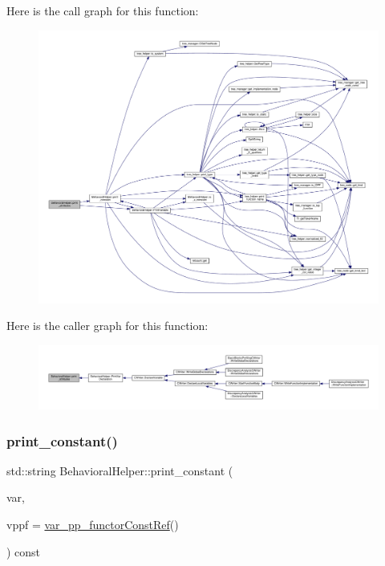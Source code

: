 Here is the call graph for this function\+:
\nopagebreak
\begin{figure}[H]
\begin{center}
\leavevmode
\includegraphics[width=350pt]{dd/db2/classBehavioralHelper_ad96b5f4d33d92f732ad3a30a70b42643_cgraph}
\end{center}
\end{figure}
Here is the caller graph for this function\+:
\nopagebreak
\begin{figure}[H]
\begin{center}
\leavevmode
\includegraphics[width=350pt]{dd/db2/classBehavioralHelper_ad96b5f4d33d92f732ad3a30a70b42643_icgraph}
\end{center}
\end{figure}
\mbox{\label{classBehavioralHelper_a5dcc301cc61cb672f0a2b593ceb61a2f}} 
\subsubsection{\texorpdfstring{print\+\_\+constant()}{print\_constant()}}
{\footnotesize\ttfamily std\+::string Behavioral\+Helper\+::print\+\_\+constant (\begin{DoxyParamCaption}\item[{unsigned int}]{var,  }\item[{const \hyperlink{var__pp__functor_8hpp_a8a6b51b6519401d911398943510557f0}{var\+\_\+pp\+\_\+functor\+Const\+Ref}}]{vppf = {\ttfamily \hyperlink{var__pp__functor_8hpp_a8a6b51b6519401d911398943510557f0}{var\+\_\+pp\+\_\+functor\+Const\+Ref}()} }\end{DoxyParamCaption}) const\hspace{0.3cm}{\ttfamily [virtual]}}



